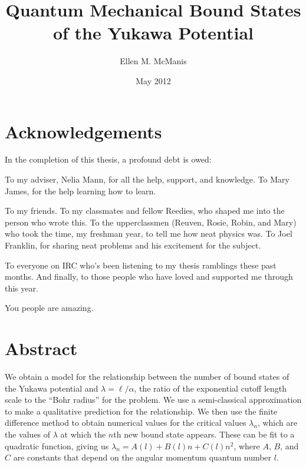 \documentclass[12pt,twoside]{reedthesis}
\title{Quantum Mechanical Bound States of the Yukawa Potential}
\author{Ellen M. McManis}
\date{May 2012}
\begin{document}
  \maketitle
  \frontmatter %
  \pagestyle{empty} %

    \chapter*{Acknowledgements}
In the completion of this thesis, a profound debt is owed:

To my adviser, Nelia Mann, for all the help, support, and knowledge. To Mary James, for the help learning how to learn.

To my friends. To my classmates and fellow Reedies, who shaped me into the person who wrote this. To the upperclassmen (Reuven, Rosie, Robin, and Mary) who took the time, my freshman year, to tell me how neat physics was. To Joel Franklin, for sharing neat problems and his excitement for the subject. 

To everyone on IRC who's been listening to my thesis ramblings these past months. And finally, to those people who have loved and supported me through this year.

You people are amazing.

    \tableofcontents
    \listoftables
    \listoffigures

    \chapter*{Abstract}
We obtain a model for the relationship between the number of bound states of the Yukawa potential and $\lambda = \ell/\alpha$, the ratio of the exponential cutoff length scale to the ``Bohr radius'' for the problem. We use a semi-classical approximation to make a qualitative prediction for the relationship. We then use the finite difference method to obtain numerical values for the critical values $\lambda_n$, which are the values of $\lambda$ at which the $n$th new bound state appears. These can be fit to a quadratic function, giving us $\lambda_n = A(l) + B(l)n + C(l)n^2$, where $A$, $B$, and $C$ are constants that depend on the angular momentum quantum number $l$. 
\end{document}
